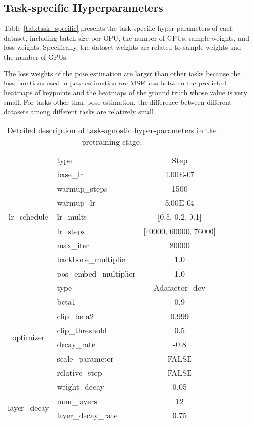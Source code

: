 \documentclass[10pt,twocolumn,letterpaper]{article}
\begin{document}
\subsection{Task-specific Hyperparameters}
Table~\ref{tab:task_specific} presents the task-specific hyper-parameters of each dataset, including batch size per GPU, the number of GPUs, sample weights, and loss weights. Specifically, the dataset weights are related to sample weights and the number of GPUs:

The loss weights of the pose estimation are larger than other tasks because the loss functions used in pose estimation are MSE loss between the predicted heatmaps of keypoints and the heatmaps of the ground truth whose value is very small. For tasks other than pose estimation, the difference between different datasets among different tasks are relatively small.  








\begin{table}[t]
  \centering
  \small
  \caption{Detailed description of task-agnostic hyper-parameters in the pretraining stage.}
    \begin{tabular}{clc}
    \hline
    \multirow{9}[2]{*}{lr\_schedule} & type  & Step \\
          & base\_lr & 1.00E-07 \\
          & warmup\_steps & 1500 \\
          & warmup\_lr & 5.00E-04 \\
          & lr\_mults & [0.5, 0.2, 0.1] \\
          & lr\_steps & [40000, 60000, 76000] \\
          & max\_iter & 80000 \\
          & backbone\_multiplier & 1.0 \\
          & pos\_embed\_multiplier & 1.0 \\
    \midrule
    \multirow{8}[2]{*}{optimizer} & type  & Adafactor\_dev \\
          & beta1 & 0.9 \\
          & clip\_beta2 & 0.999 \\
          & clip\_threshold & 0.5 \\
          & decay\_rate & -0.8 \\
          & scale\_parameter & FALSE \\
          & relative\_step & FALSE \\
          & weight\_decay & 0.05 \\
    \midrule
    \multirow{2}[2]{*}{layer\_decay} & num\_layers & 12 \\
          & layer\_decay\_rate & 0.75 \\
    \bottomrule
    \end{tabular}\label{tab:task_agnostic_pretraining}\end{table}
\end{document}
